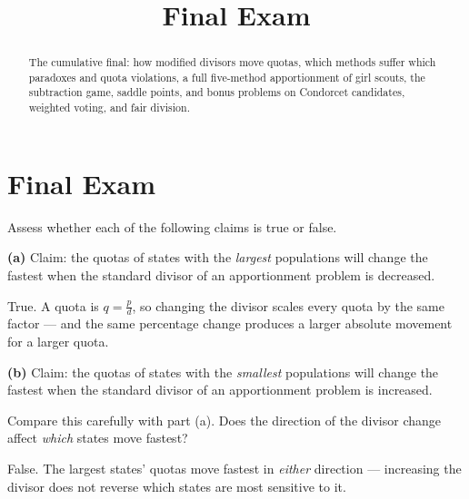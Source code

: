 \documentclass[12pt]{ximera}
\title{Final Exam}
\begin{document}
\begin{abstract}
The cumulative final: how modified divisors move quotas, which methods suffer which
paradoxes and quota violations, a full five-method apportionment of girl scouts, the
subtraction game, saddle points, and bonus problems on Condorcet candidates, weighted
voting, and fair division.
\end{abstract}
\maketitle

\section*{Final Exam}

\begin{problem}
Assess whether each of the following claims is true or false.

\begin{prompt}
\textbf{(a)} Claim: the quotas of states with the \emph{largest} populations will change
the fastest when the standard divisor of an apportionment problem is decreased.

\begin{multipleChoice}
\end{multipleChoice}

\begin{feedback}
True. A quota is $q = \frac{p}{d}$, so changing the divisor scales every quota by the
same factor --- and the same percentage change produces a larger absolute movement for a
larger quota.
\end{feedback}
\end{prompt}

\begin{prompt}
\textbf{(b)} Claim: the quotas of states with the \emph{smallest} populations will change
the fastest when the standard divisor of an apportionment problem is increased.

\begin{multipleChoice}
\end{multipleChoice}

\begin{hint}
Compare this carefully with part (a). Does the direction of the divisor change affect
\emph{which} states move fastest?
\end{hint}

\begin{feedback}
False. The largest states' quotas move fastest in \emph{either} direction --- increasing
the divisor does not reverse which states are most sensitive to it.


\end{feedback}
\end{prompt}
\end{problem}
\end{document}
